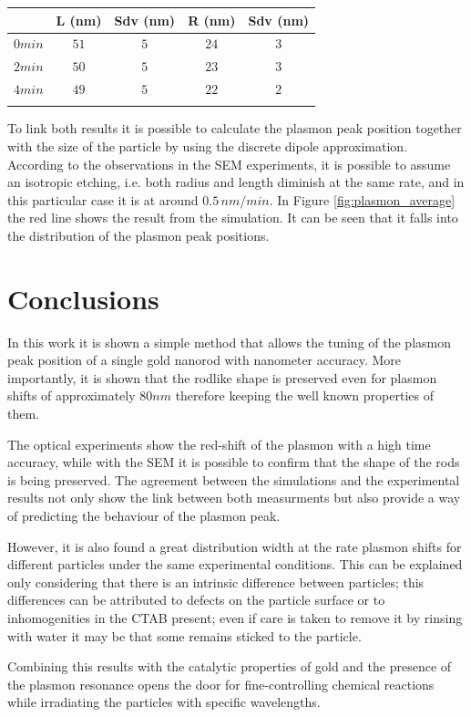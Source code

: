 \documentclass[twocolumn]{article}
\begin{document}
\begin{tabular*}{0.48\textwidth}{c c c c c}
 $\,$ & L (nm) & Sdv (nm) & R (nm) & Sdv (nm) \\\hline
 $0min$ & $51$ & $5$ & $24$ & $3$ \\ 
 $2min$ & $50$ & $5$ & $23$ & $3$ \\
 $4min$ & $49$ & $5$ & $22$ & $2$ \\
\label{tab:SEM_results}

\end{tabular*}



To link both results it is possible to calculate the plasmon peak position
together with the size of the particle by using the discrete dipole
approximation. According to the observations in the SEM experiments, it
is possible to assume an isotropic etching, i.e. both radius and length
diminish at the same rate, and in this particular case it is at around
$0.5\,nm/min$. In Figure \ref{fig:plasmon_average} the red line shows the
result from the simulation. It can be seen that it falls into the distribution
of the plasmon peak positions.

\section{Conclusions}
In this work it is shown a simple method that allows the tuning of the plasmon
peak position of a single gold nanorod with nanometer accuracy. More
importantly, it is shown that the rodlike shape is preserved even for plasmon
shifts of approximately $80nm$ therefore keeping the well known properties of
them.

The optical experiments show the red-shift of the plasmon with a high time
accuracy, while with the SEM it is possible to confirm that the shape of the
rods is being preserved. The agreement between the simulations and the
experimental results not only show the link between both measurments but also
provide a way of predicting the behaviour of the plasmon peak. 

However, it is also found a great distribution width at the rate plasmon shifts
for different particles under the same experimental conditions. This can be
explained only considering that there is an intrinsic difference between
particles; this differences can be attributed to defects on the particle surface
or to inhomogenities in the CTAB present; even if care is taken to remove it
by rinsing with water it may be that some remains sticked to the particle.

Combining this results with the catalytic properties of gold and the presence of
the plasmon resonance opens the door for fine-controlling chemical reactions
while irradiating the particles with specific wavelengths.

{}

\end{document}

